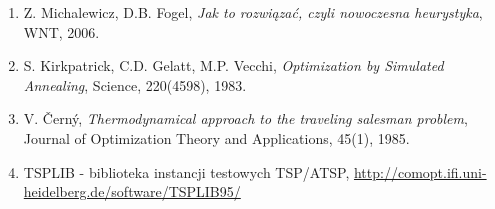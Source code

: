 \documentclass[a4paper,12pt]{article}
\begin{document}
\begin{enumerate}
    \item Z. Michalewicz, D.B. Fogel, \textit{Jak to rozwiązać, czyli nowoczesna heurystyka}, WNT, 2006.
    \item S. Kirkpatrick, C.D. Gelatt, M.P. Vecchi, \textit{Optimization by Simulated Annealing}, Science, 220(4598), 1983.
    \item V. Černý, \textit{Thermodynamical approach to the traveling salesman problem}, Journal of Optimization Theory and Applications, 45(1), 1985.
    \item TSPLIB - biblioteka instancji testowych TSP/ATSP, \url{http://comopt.ifi.uni-heidelberg.de/software/TSPLIB95/}
\end{enumerate}
\end{document}
